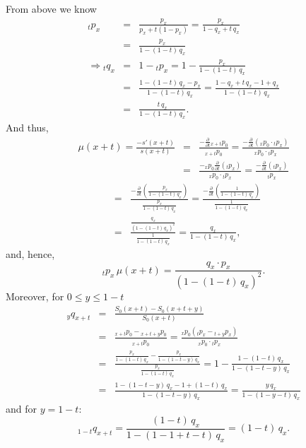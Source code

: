 \documentclass[11pt,fleqn,oneside]{book}
\begin{document}
\begin{enumerate}
\begin{itemize}
From above we know
\begin{eqnarray*}
{_tp_x} &=& \frac{p_x}{{p_x} + t(1-{p_x})} = \frac{p_x}{1-{q_x} + t \,{q_x}}\\
&=& \frac{p_x}{1- (1-t)\,{q_x}}\\
\Rightarrow {_tq_x} &=& 1 - {_tp_x} = 1 -  \frac{p_x}{1- (1-t)\,{q_x}}\\
&=&  \frac{1- (1-t)\,{q_x} - {p_x}}{1- (1-t)\,{q_x}} = \frac{1- {q_x} + t\,{q_x} - 1 + {q_x}}{1- (1-t)\,{q_x}} \\
&=&  \frac{t\,{q_x}}{1- (1-t)\,{q_x}}.
\end{eqnarray*}
And thus,
\begin{eqnarray*}
\mu(x+t) = \frac{-s'(x+t)}{s(x+t)} &=& \frac{-\frac{\partial}{\partial t} {_{x+t}p_0}}{{_{x+t}p_0}}
=  \frac{-\frac{\partial}{\partial t} \left({_xp_0}\cdot{_{t}p_x}\right)}{{_xp_0}\cdot{_{t}p_x}} \\
&=&   \frac{-{_xp_0}\frac{\partial}{\partial t} \left({_{t}p_x}\right)}{{_xp_0}\cdot{_{t}p_x}} 
=   \frac{-\frac{\partial}{\partial t} \left({_{t}p_x}\right)}{{_{t}p_x}}
\end{eqnarray*}
\begin{eqnarray*}
&=& \frac{-\frac{\partial}{\partial t} \left(\frac{p_x}{1- (1-t)\,{q_x}}\right)}{\frac{p_x}{1- (1-t)\,{q_x}}}
= \frac{-\frac{\partial}{\partial t} \left(\frac{1}{1- (1-t)\,{q_x}}\right)}{\frac{1}{1- (1-t)\,{q_x}}}\\
&=& \frac{\frac{q_x}{\left(1- (1-t)\,{q_x}\right)^2}}{\frac{1}{1- (1-t)\,{q_x}}}
= \frac{{q_x}}{1- (1-t)\,{q_x}},
\end{eqnarray*}
and, hence,
$$
{_tp_x}\, \mu(x+t) = \frac{{q_x}\cdot{p_x}}{\left(1- (1-t)\,{q_x}\right)^2}.
$$
 Moreover, for  $0\leq y \leq 1-t$
 \begin{eqnarray*}
 {_yq_{x+t}} &=& \frac{S_0(x+t) - S_0(x+t+y)}{S_0(x+t)} \\
 &=& \frac{{_{x+t}p_0} - {_{x+t+y}p_0}}{{_{x+t}p_0}} = \frac{{_{x}p_0}\left({_{t}p_x} - {_{t+y}p_x}\right)}{{_{x}p_0}\cdot{_{t}p_x}} \\
 &=& \frac{\frac{p_x}{1- (1-t)\,{q_x}} - \frac{p_x}{1- (1-t-y)\,{q_x}}}{\frac{p_x}{1- (1-t)\,{q_x}} }
 = 1 - \frac{1- (1-t)\,{q_x}}{1- (1-t-y)\,{q_x}}\\
 &=& \frac{1- (1-t-y)\,{q_x} -1+ (1-t)\,{q_x}}{1- (1-t-y)\,{q_x}}
 = \frac{y\,{q_x}}{1- (1-y-t)\,{q_x}}
 \end{eqnarray*}
 and for $y=1-t$:
$$
 {_{1-t}q_{x+t}} = \frac{(1-t)\,{q_x}}{1- (1-1 + t-t)\,{q_x}} = (1-t)\,{q_x}.
 $$
\end{itemize}


\end{enumerate}
\end{document}

